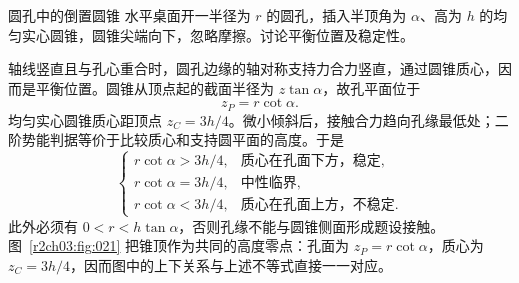 \begin{practicebox}{圆孔中的倒置圆锥}
水平桌面开一半径为 $r$ 的圆孔，插入半顶角为 $\alpha$、高为 $h$ 的均匀实心圆锥，圆锥尖端向下，忽略摩擦。讨论平衡位置及稳定性。
\label{r2ch03:pr:005}
\begin{solution}
轴线竖直且与孔心重合时，圆孔边缘的轴对称支持力合力竖直，通过圆锥质心，因而是平衡位置。圆锥从顶点起的截面半径为 $z\tan\alpha$，故孔平面位于
\[
 z_P=r\cot\alpha .
\]
均匀实心圆锥质心距顶点 $z_C=3h/4$。微小倾斜后，接触合力趋向孔缘最低处；二阶势能判据等价于比较质心和支持圆平面的高度。于是
\[
 \boxed{\begin{cases}
 r\cot\alpha>3h/4,&\text{质心在孔面下方，稳定},\\
 r\cot\alpha=3h/4,&\text{中性临界},\\
 r\cot\alpha<3h/4,&\text{质心在孔面上方，不稳定}.
 \end{cases}}
\]
此外必须有 $0<r<h\tan\alpha$，否则孔缘不能与圆锥侧面形成题设接触。图~\ref{r2ch03:fig:021} 把锥顶作为共同的高度零点：孔面为 $z_P=r\cot\alpha$，质心为 $z_C=3h/4$，因而图中的上下关系与上述不等式直接一一对应。
\figConeInHole
\end{solution}
\end{practicebox}

